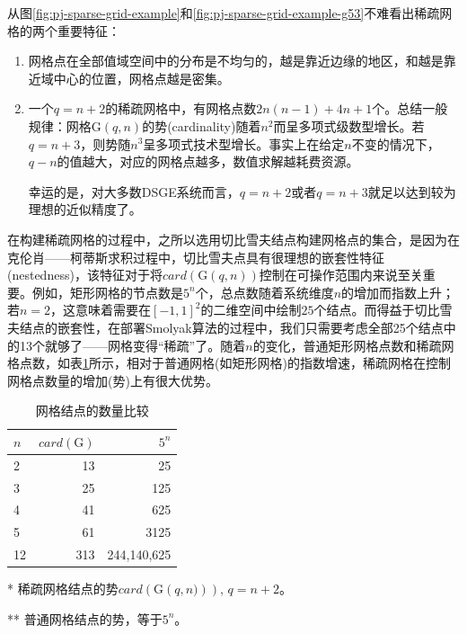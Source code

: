 从图\ref{fig:pj-sparse-grid-example}和\ref{fig:pj-sparse-grid-example-g53}不难看出稀疏网格的两个重要特征：
\begin{enumerate}
  \item 网格点在全部值域空间中的分布是不均匀的，越是靠近边缘的地区，和越是靠近域中心的位置，网格点越是密集。
  \item 一个$q=n+2$的稀疏网格中，有网格点数$2n(n-1)+4n+1$个。总结一般规律：网格$\mathrm{G}(q,n)$的势(cardinality)随着$n^{2}$而呈多项式级数型增长。若$q = n+3$，则势随$n^{3}$呈多项式技术型增长。事实上在给定$n$不变的情况下，$q-n$的值越大，对应的网格点越多，数值求解越耗费资源。

  幸运的是，对大多数DSGE系统而言，$q=n+2$或者$q=n+3$就足以达到较为理想的近似精度了。
\end{enumerate}

在构建稀疏网格的过程中，之所以选用切比雪夫结点构建网格点的集合，是因为在克伦肖——柯蒂斯求积过程中，切比雪夫点具有很理想的嵌套性特征(nestedness)，该特征对于将$card \left( \mathrm{G}(q,n)\right)$控制在可操作范围内来说至关重要。例如，矩形网格的节点数是$5^n$个，总点数随着系统维度$n$的增加而指数上升；若$n=2$，这意味着需要在$[-1,1]^{2}$的二维空间中绘制$25$个结点。而得益于切比雪夫结点的嵌套性，在部署Smolyak算法的过程中，我们只需要考虑全部25个结点中的13个就够了——网格变得``稀疏''了。随着$n$的变化，普通矩形网格点数和稀疏网格点数，如表\ref{tab:pj-sparsity-nodes-comp}所示，相对于普通网格(如矩形网格)的指数增速，稀疏网格在控制网格点数量的增加(势)上有很大优势。

\begin{table}[htbp]
  \label{tab:pj-sparsity-nodes-comp}
\begin{center}
    \scriptsize
    \def\arraystretch{1.2}
    \centering
    \caption{网格结点的数量比较}
    \begin{threeparttable}
    \begin{tabular}{lrr}
        \hline
        $n$ & $card \left( \mathrm{G} \right)$\tnote{*} & $5^{n}$ \tnote{**}\\
        \hline
        2 & 13 & 25 \\
        3 & 25 & 125 \\
        4 & 41 & 625 \\
        5 & 61 & 3125 \\
        12 & 313 & 244,140,625 \\
        \hline
    \end{tabular}
    \begin{tablenotes}
        \footnotesize
        \item[*] \tiny{稀疏网格结点的势$card \left( \mathrm{G} \left( q,n) \right) \right), \, q=n+2$。}
        \item[**] \tiny{普通网格结点的势，等于$5^{n}$。}
    \end{tablenotes}
\end{threeparttable}
\end{center}
\end{table}

